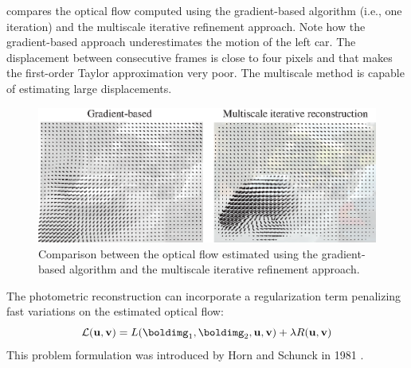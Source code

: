 \Fig{\ref{fig:comparison_gradient_vs_iterative}} compares the optical flow computed using the gradient-based algorithm (i.e., one iteration) and the multiscale iterative refinement approach. Note how the gradient-based approach underestimates the motion of the left car. The displacement between consecutive frames is close to four pixels and that makes the first-order Taylor approximation very poor. The multiscale method is capable of estimating large displacements.

\begin{figure}[t]
    \centerline{
        \includegraphics[width=1\linewidth]{figures/optical_flow/comparison_gradient_vs_iterative.eps}
    }
    \caption{Comparison between the optical flow estimated using the gradient-based algorithm and the multiscale iterative refinement approach.}
    \label{fig:comparison_gradient_vs_iterative}
\end{figure}





The photometric reconstruction can incorporate a regularization term penalizing fast variations on the estimated optical flow:
\begin{equation}
    \mathcal{L}(\mathbf{u}, \mathbf{v}) = L(\boldimg_1,\boldimg_2,\mathbf{u}, \mathbf{v}) + \lambda R(\mathbf{u}, \mathbf{v}) \\
    \label{eq:horn_shunck_objective}
\end{equation}
This problem formulation was introduced by Horn and Schunck in 1981 \cite{Horn81}.

